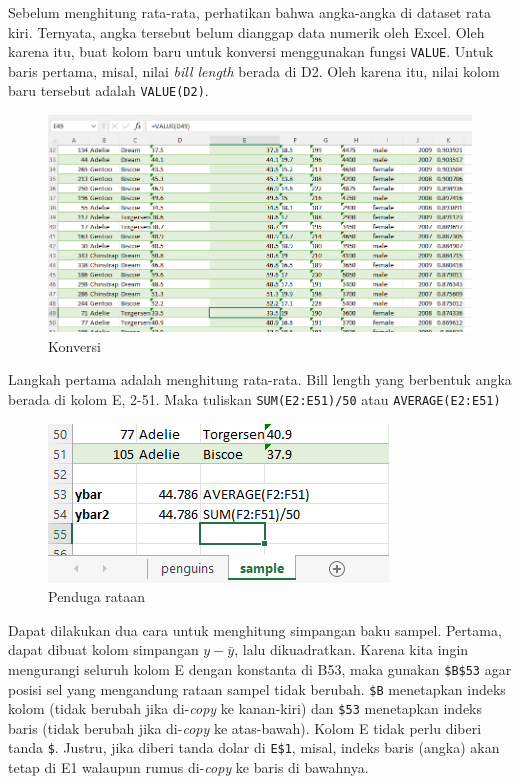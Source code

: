 \documentclass[
  letterpaper,
  DIV=11,
  numbers=noendperiod]{scrreprt}
\begin{document}
Sebelum menghitung rata-rata, perhatikan bahwa angka-angka di dataset
rata kiri. Ternyata, angka tersebut belum dianggap data numerik oleh
Excel. Oleh karena itu, buat kolom baru untuk konversi menggunakan
fungsi \texttt{VALUE}. Untuk baris pertama, misal, nilai \emph{bill
length} berada di D2. Oleh karena itu, nilai kolom baru tersebut adalah
\texttt{VALUE(D2)}.

\begin{figure}

{\centering \includegraphics{./count-2.png}

}

\caption{Konversi}

\end{figure}

Langkah pertama adalah menghitung rata-rata. Bill length yang berbentuk
angka berada di kolom E, 2-51. Maka tuliskan \texttt{SUM(E2:E51)/50}
atau \texttt{AVERAGE(E2:E51)}

\begin{figure}

{\centering \includegraphics{./count-3.png}

}

\caption{Penduga rataan}

\end{figure}

Dapat dilakukan dua cara untuk menghitung simpangan baku sampel.
Pertama, dapat dibuat kolom simpangan \(y-\bar{y}\), lalu dikuadratkan.
Karena kita ingin mengurangi seluruh kolom E dengan konstanta di B53,
maka gunakan \texttt{\$B\$53} agar posisi sel yang mengandung rataan
sampel tidak berubah. \texttt{\$B} menetapkan indeks kolom (tidak
berubah jika di-\emph{copy} ke kanan-kiri) dan \texttt{\$53} menetapkan
indeks baris (tidak berubah jika di-\emph{copy} ke atas-bawah). Kolom E
tidak perlu diberi tanda \texttt{\$}. Justru, jika diberi tanda dolar di
\texttt{E\$1}, misal, indeks baris (angka) akan tetap di E1 walaupun
rumus di-\emph{copy} ke baris di bawahnya.
\end{document}
